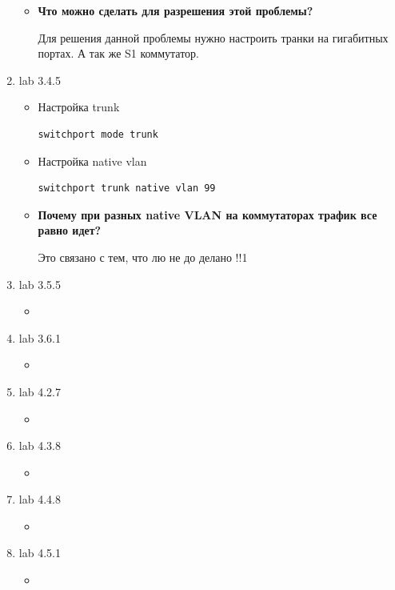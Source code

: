 \documentclass[a4paper,14pt]{extarticle}
\begin{document}
\begin{enumerate}
\begin{itemize}
            \item \textbf{Что можно сделать для разрешения этой проблемы?}\par
                Для решения данной проблемы нужно настроить транки на гигабитных портах. А так же S1 коммутатор. 
        \end{itemize}
        \item lab 3.4.5
        \begin{itemize}
            \item Настройка trunk
                \begin{lstlisting}
switchport mode trunk
                \end{lstlisting}
            \item Настройка native vlan 
                \begin{lstlisting}
switchport trunk native vlan 99
                \end{lstlisting}
            \item \textbf{Почему при разных native VLAN на коммутаторах трафик все равно идет?}\par
                Это связано с тем, что лю
                не до делано !!1
        \end{itemize}
        \item lab 3.5.5
        \begin{itemize}
            \item 
        \end{itemize}
        \item lab 3.6.1
        \begin{itemize}
            \item 
        \end{itemize}
        \item lab 4.2.7
        \begin{itemize}
            \item 
        \end{itemize}
        \item lab 4.3.8
        \begin{itemize}
            \item 
        \end{itemize}
        \item lab 4.4.8
        \begin{itemize}
            \item 
        \end{itemize}
        \item lab 4.5.1
        \begin{itemize}
            \item 
        \end{itemize}
    \end{enumerate}
\end{document}
